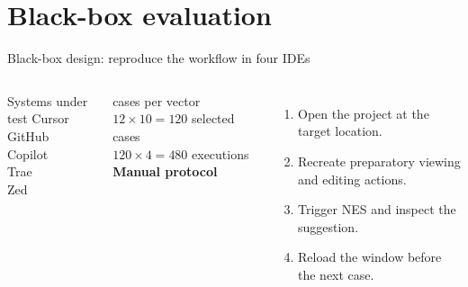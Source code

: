 \section{Black-box evaluation}
\begin{frame}{Black-box design: reproduce the workflow in four IDEs}
\begin{columns}[T]
\vspace{-5mm}
\begin{block}{Systems under test}
Cursor\\GitHub Copilot\\Trae\\Zed
\end{block}
 cases per vector\\$12\times10=120$ selected cases\\$120\times4=480$ executions
\textbf{Manual protocol}
\begin{enumerate}
\item Open the project at the target location.
\item Recreate preparatory viewing and editing actions.
\item Trigger NES and inspect the suggestion.
\item Reload the window before the next case.
\end{enumerate}
\end{columns}
\end{frame}
